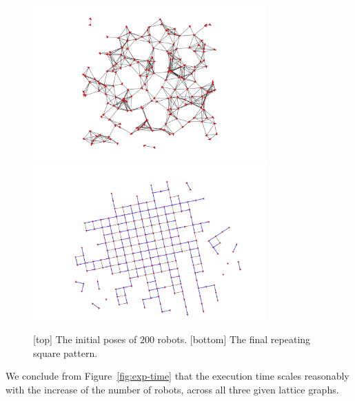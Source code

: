 \begin{figure}
    \centering
  \includegraphics[trim=5cm 0cm 5cm 0cm, clip=true, width=0.8\textwidth]{figs/sq200_init.png}
  \bigskip
  \includegraphics[trim=5cm 0cm 5cm 0cm, clip=true, width=0.8\textwidth]{figs/sq200_final.png}
  \caption{[top] The initial poses of $200$ robots. [bottom] The final repeating square pattern.}
  \label{fig:sq-init-final}
\end{figure}

We conclude from Figure~\ref{fig:exp-time} that the execution time scales reasonably with the increase of the number of robots, across all three given lattice graphs. 


